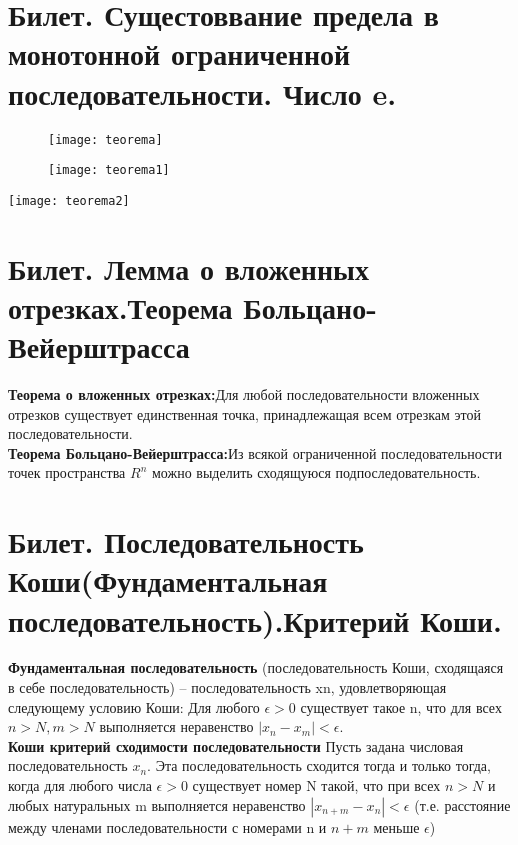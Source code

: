 \documentclass[12pt]{article}
\begin{document}
	\section{Билет. Сущестоввание предела в монотонной ограниченной последовательности. Число e.} 
	
	
	
\begin{figure}

\texttt{[image: teorema]}
\end{figure}
\begin{figure}
	
	\texttt{[image: teorema1]}
\end{figure}

\begin{figure*}
\texttt{[image: teorema2]}
\end{figure*}


\newpage

 
 
	\section{Билет. Лемма о вложенных отрезках.Теорема Больцано-Вейерштрасса}
	
	\textbf{Теорема о вложенных отрезках:}Для любой последовательности вложенных отрезков существует единственная точка, принадлежащая всем отрезкам этой последовательности.\\
	\textbf{Теорема Больцано-Вейерштрасса:}Из всякой ограниченной последовательности точек пространства $R^n$  можно выделить сходящуюся подпоследовательность.
	
	\section{Билет. Последовательность Коши(Фундаментальная последовательность).Критерий Коши.}
	
	\textbf{Фундаментальная последовательность} (последовательность Коши, сходящаяся в себе последовательность)  – последовательность  {xn}, удовлетворяющая следующему условию Коши:
	Для любого $\epsilon > 0$ существует такое n, что для всех $n > N, m > N$ выполняется неравенство $|x_n - x_m| < \epsilon$. \\
	\textbf{Коши критерий сходимости последовательности} Пусть задана числовая последовательность ${x_n}$. Эта последовательность сходится тогда и только тогда, когда для любого числа $\epsilon > 0$ существует номер N такой, что при всех $n > N$  и любых натуральных m выполняется неравенство $|x_{n+m} -x_n|<\epsilon$      (т.е. расстояние между членами последовательности с номерами n  и $n+m$ меньше $\epsilon$)
	
\end{document}
